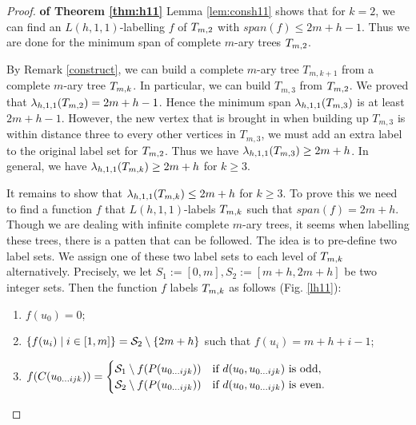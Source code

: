 \begin{proof}{\bf of Theorem \ref{thm:h11}}
Lemma \ref{lem:consh11} shows that for $k = 2$, we can find an $L(h,1,1)$-labelling $f$ of $\tm2$ with $span(f) \le 2m+h-1$. Thus we are done for the minimum span of complete $m$-ary trees $\tm2$. 

By Remark \ref{construct}, we can build a complete $m$-ary tree $T_{m,k+1}$ from a complete $m$-ary tree $T_{m,k}$. In particular, we can build $T_{m,3}$ from $\tm2$. We proved that $\lamh11(\tm2) = 2m+h-1$. Hence the minimum span $\lamh11(T_{m,3})$ is at least $2m+h-1$. However, the new vertex that is brought in when building up $T_{m,3}$ is within distance three to every other vertices in $T_{m,3}$, we must add an extra label to the original label set for $\tm2$. Thus we have $\lamh11(T_{m,3}) \ge 2m+h$. In general, we have $\lamh11(\tmk) \ge 2m+h$ for $k \ge 3$. 

It  remains to show that $\lambda_{h,1,1}(T_{m,k}) \le 2m+h$ for $k \ge 3$. To prove this we need to find a function $f$ that $L(h,1,1)$-labels $T_{m,k}$ such that $span(f) = 2m+h$. Though we are dealing with infinite complete $m$-ary trees, it seems when labelling these trees, there is a patten that can be followed. The idea is to pre-define two label sets. We assign one of these two label sets to each level of $T_{m,k}$ alternatively. Precisely, we let $S_1:=[0,m], S_2:= [m+h, 2m+h]$ be two integer sets. Then the function $f$ labels $T_{m,k}$ as follows (Fig. \ref{lh11}): 
\begin{enumerate}[(1)]
\item $f(u_0) = 0$;
\item $\{f(u_{i}) \mid i \in [1,m]\} = {\cal S}_2 \setminus \{2m+h\}$ such that $f(u_{i}) = m+h+i-1$;
\item 
$
 f(C(u_{0\dots ijk})) =
  \begin{cases}
   {\cal S}_1 \setminus f(P(u_{0\dots ijk})) & \text{if } d(u_0, u_{0\dots ijk}) \text{ is odd}, \\
   {\cal S}_2 \setminus f(P(u_{0\dots ijk})) & \text{if } d(u_0, u_{0\dots ijk}) \text{ is even}. 
  \end{cases}$
\end{enumerate}


\end{proof}
